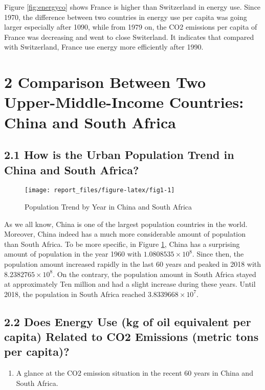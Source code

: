 \documentclass[11pt,a4paper,]{article}
\providecommand{\tightlist}{%
  \setlength{\itemsep}{0pt}\setlength{\parskip}{0pt}}
\begin{document}
Figure \ref{fig:energyco} shows France is higher than Switzerland in energy use. Since 1970, the difference between two countries in energy use per capita was going larger especially after 1090, while from 1979 on, the CO2 emissions per capita of France was decreasing and went to close Switerland. It indicates that compared with Switzerland, France use energy more efficiently after 1990.

\clearpage
\section*{2 Comparison Between Two Upper-Middle-Income Countries: China and South Africa}

\subsection*{2.1 How is the Urban Population Trend in China and South Africa?}

\begin{figure}[!h]

{\centering \texttt{[image: report\_files/figure-latex/fig1-1]} 

}

\caption{Population Trend by Year in China and South Africa}\label{fig:fig1}
\end{figure}

As we all know, China is one of the largest population countries in the world. Moreover, China indeed has a much more considerable amount of population than South Africa. To be more specific, in Figure \ref{fig:fig1}, China has a surprising amount of population in the year 1960 with \textbf{\ensuremath{1.0808535\times 10^{8}}}. Since then, the population amount increased rapidly in the last 60 years and peaked in 2018 with \textbf{\ensuremath{8.2382765\times 10^{8}}}. On the contrary, the population amount in South Africa stayed at approximately Ten million and had a slight increase during these years. Until 2018, the population in South Africa reached \textbf{\ensuremath{3.8339668\times 10^{7}}}.

\subsection*{2.2 Does Energy Use (kg of oil equivalent per capita) Related to CO2 Emissions (metric tons per capita)?}

\begin{enumerate}
\def\labelenumi{(\arabic{enumi})}
\tightlist
\item
  A glance at the CO2 emission situation in the recent 60 years in China and South Africa.
\end{enumerate}
\end{document}
